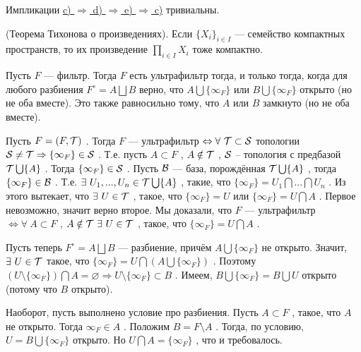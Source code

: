 \vspace
Импликации \underline{c) \( \Rightarrow \) d) \( \Rightarrow \) e) \( \Rightarrow \) c)} тривиальны.

\SSendp

\SSsect[!!!] (Теорема Тихонова о произведениях).
Если \( \{X_i\}_{i \in I} \) --- семейство компактных пространств, то их произведение \( \underset{i \in I}{\prod} X_i \) тоже компактно.

\pagebreak

\SSbullet 

\SSsect Пусть \( F \) --- фильтр. Тогда \( F \) есть ультрафильтр тогда, и только тогда, когда для любого разбиения \( F^{\circ} = A \bigsqcup B \) верно, что \( A \bigcup \{\infty_F\} \) или \( B \bigcup \{\infty_F\} \) открыто (но не оба вместе). Это также равносильно тому, что \( A \) или \( B \) замкнуто (но не оба вместе).

\SSproof

Пусть \( F = (F,\mathcal{T}) \) . Тогда \( F \) --- ультрафильтр \( \Leftrightarrow \forall~ \mathcal{T} \subset \mathcal{S} \) топологии \( \mathcal{S} \neq \mathcal{T} \Rightarrow \{\infty_F\} \in \mathcal{S} \) . Т.е. пусть \( A \subset F \) , \( A \notin \mathcal{T} \) , \( \mathcal{S} \) -- топология с предбазой \( \mathcal{T} \bigcup \{A\} \) . Тогда \( \{\infty_F\} \in \mathcal{S} \) . Пусть \( \mathcal{B} \) --- база, порождённая \( \mathcal{T} \bigcup \{A\} \) , тогда \( \{\infty_F\} \in \mathcal{B} \) . Т.е. \( \exists~U_1,...,U_n \in \mathcal{T} \bigcup \{A\} \) , такие, что \( \{\infty_F\} = U_1\bigcap ... \bigcap U_n \) . Из этого вытекает, что \( \exists~U \in \mathcal{T} \) , такое, что \( \{\infty_F\} = U \) или \( \{\infty_F\} = U \bigcap A \) . Первое невозможно, значит верно второе. Мы доказали, что \( F \) --- ультрафильтр \( \Leftrightarrow \forall~ A \subset F \) , \( A \notin \mathcal{T} ~\exists~ U \in \mathcal{T} \) , такое, что \( \{\infty_F\} = U \bigcap A \) .

Пусть теперь \( F^{\circ} = A \bigsqcup B \) --- разбиение, причём \( A \bigcup \{\infty_F\} \) не открыто. Значит, \( \exists~ U \in \mathcal{T} \) такое, что \( \{\infty_F\} = U \bigcap (A \bigcup \{\infty_F\}) \) . Поэтому \( (U \setminus \{\infty_F\}) \bigcap A = \varnothing \Rightarrow U \setminus \{\infty_F\} \subset B \) . Имеем, \( B \bigcup \{\infty_F\} = B \bigcup U \) открыто (потому что \( B \) открыто).

Наоборот, пусть выполнено условие про разбиения. Пусть \( A \subset F \) , такое, что \( A \) не открыто. Тогда \( \infty_F \in A \) . Положим \( B = F \setminus A \) . Тогда, по условию, \( U = B \bigcup \{\infty_F\} \) открыто. Но \( U \bigcap A = \{\infty_F\} \) , что и требовалось.

